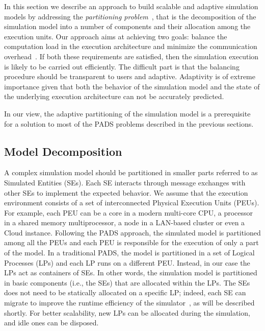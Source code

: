 \documentclass[1p]{elsarticle}
\begin{document}
In this section we describe an approach to build scalable and adaptive
simulation models by addressing the \emph{partitioning
  problem}~\cite{gda-ijspm-2009}, that is the decomposition of the
simulation model into a number of components and their allocation
among the execution units. Our approach aims at achieving two goals:
balance the computation load in the execution architecture and
minimize the communication overhead~\cite{bagrodia98}. If both these
requirements are satisfied, then the simulation execution is likely to
be carried out efficiently. The difficult part is that the balancing
procedure should be transparent to users and adaptive.  Adaptivity is
of extreme importance given that both the behavior of the simulation
model and the state of the underlying execution architecture can not
be accurately predicted.

In our view, the adaptive partitioning of the simulation model is a 
prerequisite for a solution to most of the PADS problems described in the 
previous sections.

\subsection{Model Decomposition}

A complex simulation model should be partitioned in smaller parts
referred to as Simulated Entities (SEs). Each SE interacts through
message exchanges with other SEs to implement the expected
behavior. We assume that the execution environment consists of a set
of interconnected Physical Execution Units (PEUs).  For example, each
PEU can be a core in a modern multi-core CPU, a processor in a shared
memory multiprocessor, a node in a LAN-based cluster or even a Cloud
instance. Following the PADS approach, the simulated model is
partitioned among all the PEUs and each PEU is responsible for the
execution of only a part of the model. In a traditional PADS, the
model is partitioned in a set of Logical Processes (LPs) and each LP
runs on a different PEU. Instead, in our case the LPs act as
containers of SEs. In other words, the simulation model is partitioned
in basic components (i.e., the SEs) that are allocated within the
LPs. The SEs does not need to be statically allocated on a specific
LP; indeed, each SE can migrate to improve the runtime efficiency of
the simulator~\cite{gda-dsrt-2004}, as will be described shortly. For
better scalability, new LPs can be allocated during the simulation,
and idle ones can be disposed.
\end{document}

